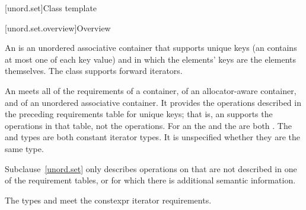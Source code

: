 [unord.set]{Class template }%

[unord.set.overview]{Overview}

\pnum
{}%
%
An  is an unordered associative container that
supports unique keys (an  contains at most one of each
key value) and in which the elements' keys are the elements
themselves.
The  class
supports forward iterators.

\pnum
An  meets all of the requirements
of a container,
of an allocator-aware container, and
of an unordered associative container.
It provides the operations described in the preceding requirements table for unique keys;
that is, an  supports the  operations in that table,
not the  operations.
For an  the 
and the  are both .
The  and  types are both constant iterator types.
It is unspecified whether they are the same type.

\pnum
Subclause~\ref{unord.set} only describes operations on  that
are not described in one of the requirement tables, or for which there
is additional semantic information.

\pnum
The types  and  meet
the constexpr iterator requirements.

